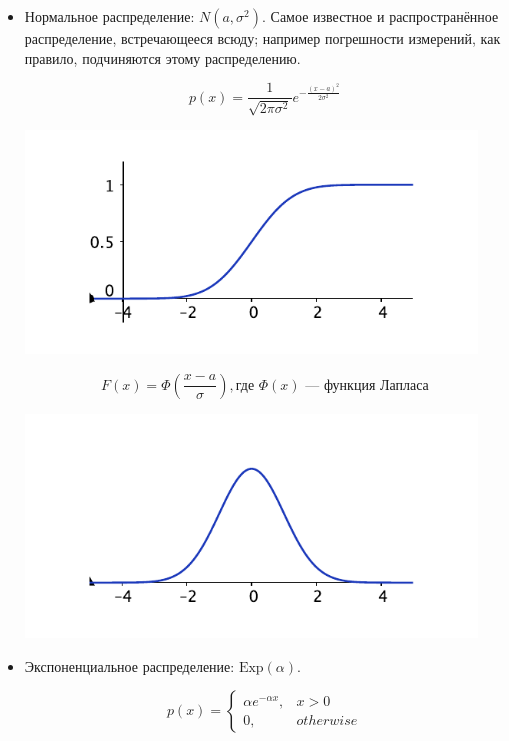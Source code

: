 \begin{itemize}
        \item Нормальное распределение: $N(a, \sigma^2)$. Самое известное и распространённое распределение,
            встречающееся всюду; например погрешности измерений, как правило, подчиняются этому распределению.

            \[
                p(x) = \frac{1}{\sqrt{2\pi\sigma^2}}e^{-\frac{(x-a)^2}{2\sigma^2}}
            \]

            \includegraphics[width=12cm]{main-lectures/images/Lec_8_4.pdf}

            \[
                F(x) = \Phi\left(\frac{x - a}{\sigma}\right), \text{где $\Phi(x)$ --- функция Лапласа}
            \]

            \includegraphics[width=12cm]{main-lectures/images/Lec_8_5.pdf}

        \item Экспоненциальное распределение: $\mathrm{Exp}(\alpha)$.

            \[
                p(x) = \begin{cases}
                    \alpha e^{-\alpha x}, &x > 0 \\
                    0, & otherwise
                    \end{cases}
            \]


\end{itemize}
